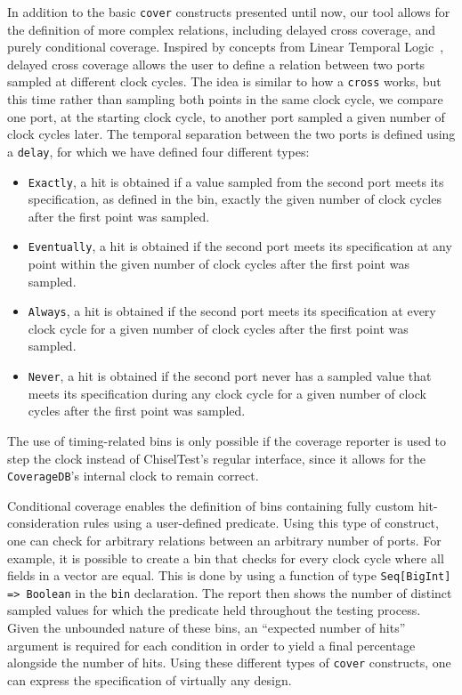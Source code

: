 \documentclass[conference]{IEEEtran}
\begin{document}
In addition to the basic \texttt{cover} constructs presented until now, our tool allows for the definition of more complex relations, including delayed cross coverage, and purely conditional coverage.
Inspired by concepts from Linear Temporal Logic~\cite{Dax2010:temporal-logics}, delayed cross coverage allows the user to define a relation between two ports sampled at different clock cycles.
The idea is similar to how a \texttt{cross} works, but this time rather than sampling both points in the same clock cycle, we compare one port, at the starting clock cycle, to another port sampled a given number of clock cycles later. 
The temporal separation between the two ports is defined using a \texttt{delay}, for which we have defined four different types:
 \begin{itemize}
 \item \texttt{Exactly}, a hit is obtained if a value sampled from the second port meets its specification, as defined in the bin, exactly the given number of clock cycles after the first point was sampled.
 \item \texttt{Eventually}, a hit is obtained if the second port meets its specification at any point within the given number of clock cycles after the first point was sampled.  
 \item \texttt{Always}, a hit is obtained if the second port meets its specification at every clock cycle for a given number of clock cycles after the first point was sampled.
 \item \texttt{Never}, a hit is obtained if the second port never has a sampled value that meets its specification during any clock cycle for a given number of clock cycles after the first point was sampled.
\end{itemize} 
The use of timing-related bins is only possible if the coverage reporter is used to step the clock instead of ChiselTest's regular interface, since it allows for the \texttt{CoverageDB}'s internal clock to remain correct.

Conditional coverage enables the definition of bins containing fully custom hit-consideration rules using a user-defined predicate.
Using this type of construct, one can check for arbitrary relations between an arbitrary number of ports.
For example, it is possible to create a bin that checks for every clock cycle where all fields in a vector are equal.
This is done by using a function of type \texttt{Seq[BigInt] => Boolean} in the \texttt{bin} declaration.
The report then shows the number of distinct sampled values for which the predicate held throughout the testing process.
Given the unbounded nature of these bins, an ``expected number of hits'' argument is required for each condition in order to yield a final percentage alongside the number of hits.
Using these different types of \texttt{cover} constructs, one can express the specification of virtually any design.
\end{document}
